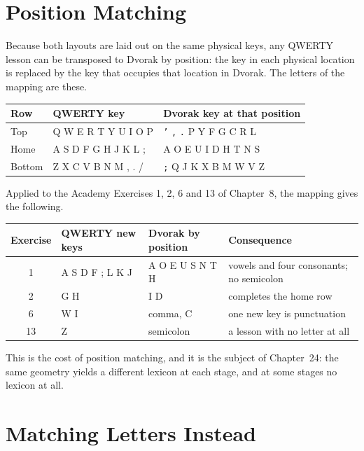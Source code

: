 \section{Position Matching}

Because both layouts are laid out on the same physical keys, any QWERTY lesson can be transposed to Dvorak by position: the key in each physical location is replaced by the key that occupies that location in Dvorak. The letters of the mapping are these.

\begin{center}
\begin{tabular}{@{}lll@{}}
\toprule
Row & QWERTY key & Dvorak key at that position \\
\midrule
Top & Q W E R T Y U I O P & \texttt{'} \texttt{,} \texttt{.} P Y F G C R L \\
Home & A S D F G H J K L ; & A O E U I D H T N S \\
Bottom & Z X C V B N M , . / & \texttt{;} Q J K X B M W V Z \\
\bottomrule
\end{tabular}
\end{center}

Applied to the Academy Exercises 1, 2, 6 and 13 of Chapter~8, the mapping gives the following.

\begin{center}
\begin{tabular}{@{}clll@{}}
\toprule
Exercise & QWERTY new keys & Dvorak by position & Consequence \\
\midrule
1 & A S D F ; L K J & A O E U S N T H & vowels and four consonants; no semicolon \\
2 & G H & I D & completes the home row \\
6 & W I & comma, C & one new key is punctuation \\
13 & Z & semicolon & a lesson with no letter at all \\
\bottomrule
\end{tabular}
\end{center}

This is the cost of position matching, and it is the subject of Chapter~24: the same geometry yields a different lexicon at each stage, and at some stages no lexicon at all.

\section{Matching Letters Instead}

